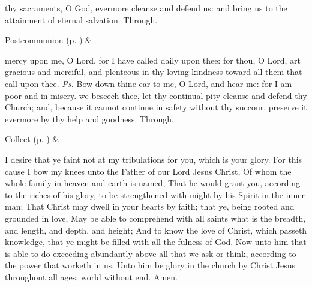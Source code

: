 \postcommunion
{} thy sacraments, O God, evermore cleanse and defend us: and bring us to the attainment of eternal salvation. Through.


\begin{rubric}
     Postcommunion  (p. \pageref{SPSaints}) \&  
\end{rubric}


\clearpage
{}


\introit
{} mercy upon me, O Lord, for I have called daily upon thee: for thou, O Lord, art gracious and merciful, and plenteous in thy loving kindness toward all them that call upon thee. \textit{Ps.} Bow down thine ear to me, O Lord, and hear me: for I am poor and in misery.
\collect
{} we beseech thee, let thy continual pity cleanse and defend thy Church; and, because it cannot continue in safety without thy succour, preserve it evermore by thy help and goodness. Through.
\begin{rubric}
     Collect  (p. \pageref{SPSaints}) \&  
\end{rubric}

 I desire that ye faint not at my tribulations for you, which is your glory. For this cause I bow my knees unto the Father of our Lord Jesus Christ, Of whom the whole family in heaven and earth is named, That he would grant you, according to the riches of his glory, to be strengthened with might by his Spirit in the inner man; That Christ may dwell in your hearts by faith; that ye, being rooted and grounded in love, May be able to comprehend with all saints what is the breadth, and length, and depth, and height; And to know the love of Christ, which passeth knowledge, that ye might be filled with all the fulness of God. Now unto him that is able to do exceeding abundantly above all that we ask or think, according to the power that worketh in us, Unto him be glory in the church by Christ Jesus throughout all ages, world without end. Amen.

